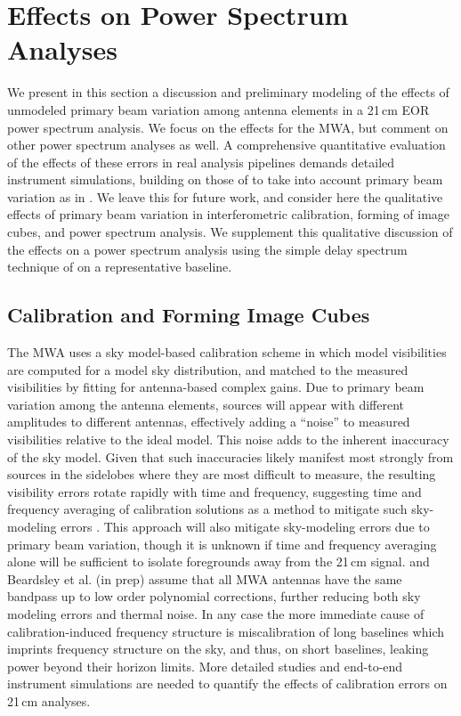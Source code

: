 \section{Effects on Power Spectrum Analyses}
\label{sec:effectsonpowerspectra}

We present in this section a discussion and preliminary modeling of the effects of unmodeled primary beam variation among antenna elements in a 21\,cm EOR power spectrum analysis. We focus on the effects for the MWA, but comment on other power spectrum analyses as well. A comprehensive quantitative evaluation of the effects of these errors in real analysis pipelines demands detailed instrument simulations, building on those of \citet{nithya15} to take into account primary beam variation as in \citet{shaw15,asad15}. We leave this for future work, and consider here the qualitative effects of primary beam variation in interferometric calibration, forming of image cubes, and power spectrum analysis. We supplement this qualitative discussion of the effects on a power spectrum analysis using the simple delay spectrum technique of \citet{parsons12a,parsons12b} on a representative baseline.

\subsection{Calibration and Forming Image Cubes}
\label{sec:cal}
The MWA uses a sky model-based calibration scheme in which model visibilities are computed for a model sky distribution, and matched to the measured visibilities by fitting for antenna-based complex gains. Due to primary beam variation among the antenna elements, sources will appear with different amplitudes to different antennas, effectively adding a ``noise'' to measured visibilities relative to the ideal model. This noise adds to the inherent inaccuracy of the sky model. Given that such inaccuracies likely manifest most strongly from sources in the sidelobes where they are most difficult to measure, the resulting visibility errors rotate rapidly with time and frequency, suggesting time and frequency averaging of calibration solutions as a method to mitigate such sky-modeling errors \citep{braun2013}. This approach will also mitigate sky-modeling errors due to primary beam variation, though it is unknown if time and frequency averaging alone will be sufficient to isolate foregrounds away from the 21\,cm signal. \citet{dillonneben} and Beardsley et al. (in prep) assume that all MWA antennas have the same bandpass up to low order polynomial corrections, further reducing both sky modeling errors and thermal noise. In any case the more immediate cause of calibration-induced frequency structure is miscalibration of long baselines which imprints frequency structure on the sky, and thus, on short baselines, leaking power beyond their horizon limits. More detailed studies and end-to-end instrument simulations are needed to quantify the effects of calibration errors on 21\,cm analyses.

